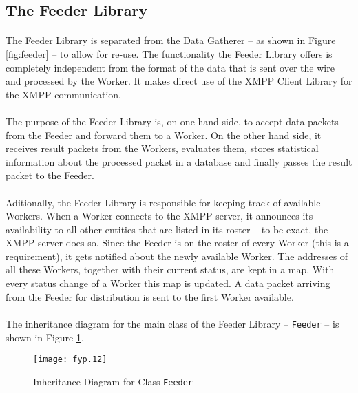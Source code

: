 \subsection{The Feeder Library}
\label{sec:feederlib}
\paragraph{}
The Feeder Library is separated from the Data Gatherer -- as shown in Figure \ref{fig:feeder} -- to allow for re-use. The functionality the Feeder Library offers is completely independent from the format of the data that is sent over the wire and processed by the Worker. It makes direct use of the XMPP Client Library for the XMPP communication.

\paragraph{}
The purpose of the Feeder Library is, on one hand side, to accept data packets from the Feeder and forward them to a Worker. On the other hand side, it receives result packets from the Workers, evaluates them, stores statistical information about the processed packet in a database and finally passes the result packet to the Feeder.

\paragraph{}
Aditionally, the Feeder Library is responsible for keeping track of available Workers. When a Worker connects to the XMPP server, it announces its availability to all other entities that are listed in its roster -- to be exact, the XMPP server does so. Since the Feeder is on the roster of every Worker (this is a requirement), it gets notified about the newly available Worker. The addresses of all these Workers, together with their current status, are kept in a map. With every status change of a Worker this map is updated. A data packet arriving from the Feeder for distribution is sent to the first Worker available.

\paragraph{}
The inheritance diagram for the main class of the Feeder Library -- \texttt{Feeder} -- is shown in Figure \ref{fig:inhfeeder}.

\begin{figure}[H]
\begin{center}
\texttt{[image: fyp.12]}
\end{center}
\caption{Inheritance Diagram for Class \texttt{Feeder}}
\label{fig:inhfeeder}
\end{figure}

